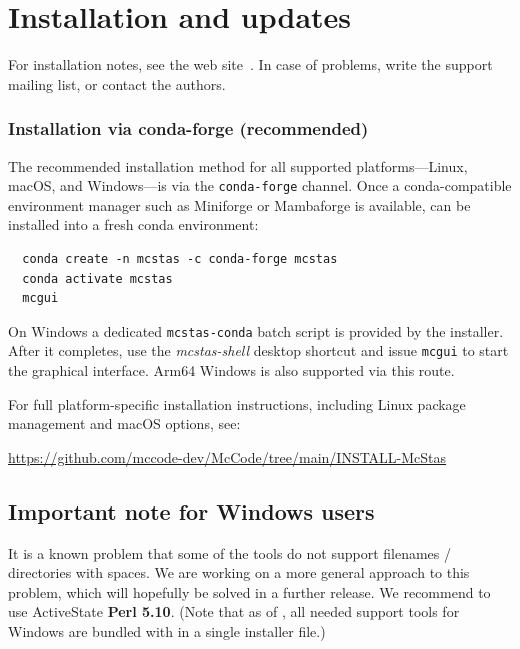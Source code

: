 \section{Installation and updates}
\label{s:install}

For installation notes, see the web site~\cite{mcstas_webpage}.
In case of problems, write the support mailing list,
or contact the authors.

\subsubsection{Installation via conda-forge (recommended)}
\label{s:install-conda}

The recommended installation method for all supported platforms---Linux,
macOS, and Windows---is via the \texttt{conda-forge} channel.  Once a
conda-compatible environment manager such as Miniforge or Mambaforge is
available, \McStas can be installed into a fresh conda environment:

\begin{verbatim}
  conda create -n mcstas -c conda-forge mcstas
  conda activate mcstas
  mcgui
\end{verbatim}

On Windows a dedicated \texttt{mcstas-conda} batch script is provided by
the installer.  After it completes, use the \emph{mcstas-shell} desktop
shortcut and issue \texttt{mcgui} to start the graphical interface.
Arm64 Windows is also supported via this route.

For full platform-specific installation instructions, including Linux
package management and macOS options, see:
\begin{center}
  \url{https://github.com/mccode-dev/McCode/tree/main/INSTALL-McStas}
\end{center}

\subsection{Important note for Windows users} 
It is a known problem that some of
the \MCS tools do not support filenames / directories with spaces.
We are working on a more general approach to this problem, which will
hopefully be solved in a further release. We recommend to use
ActiveState \textbf{Perl 5.10}. (Note that as of , all needed
support tools for Windows are bundled with \MCS in a single installer file.)

